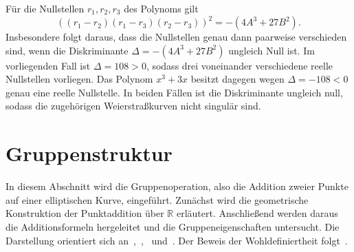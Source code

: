 Für die Nullstellen $r_1, r_2, r_3$ des Polynoms gilt
\[
    {((r_1 - r_2)(r_1 - r_3)(r_2 - r_3))}^2 = -(4A^3 + 27B^2).
\]
Insbesondere folgt daraus, dass die Nullstellen genau dann paarweise verschieden sind, wenn die Diskriminante $\Delta = -(4A^3 + 27B^2)$ ungleich Null ist. Im vorliegenden Fall ist $\Delta=108 > 0$, sodass drei voneinander verschiedene reelle Nullstellen vorliegen. Das Polynom $x^3+3x$ besitzt dagegen wegen $\Delta=-108<0$ genau eine reelle Nullstelle. In beiden Fällen ist die Diskriminante ungleich null, sodass die zugehörigen Weierstraßkurven nicht singulär sind.

\section{Gruppenstruktur}
In diesem Abschnitt wird die Gruppenoperation, also die Addition zweier Punkte auf einer elliptischen Kurve, eingeführt. Zunächst wird die geometrische Konstruktion der Punktaddition über $\mathbb{R}$ erläutert. Anschließend werden daraus die Additionsformeln hergeleitet und die Gruppeneigenschaften untersucht. Die Darstellung orientiert sich an~\cite[S.~12--15]{washington08},~\cite[S.~8--19,30--31]{silverman06},~\cite[S.~179~ff.]{kapl05}
und~\cite[S.~99]{buell24}. Der Beweis der Wohldefiniertheit folgt~\cite[S.~477--481]{zwegers24}.

